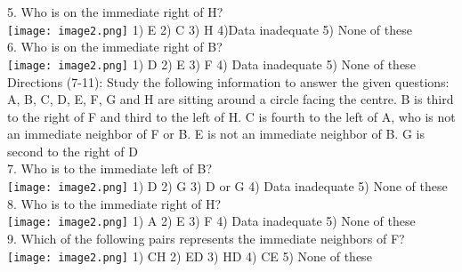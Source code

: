 \documentclass[
]{article}
\begin{document}
5. Who is on the immediate right of H?\\
\texttt{[image: image2.png]}
1) E \hspace{2mm}2) C \hspace{2mm}3) H
\hspace{2mm}4)Data inadequate \hspace{2mm}5) None of these\\

6. Who is on the immediate right of B?\\
\texttt{[image: image2.png]}
1) D \hspace{2mm}2) E \hspace{2mm}3) F
\hspace{2mm}4) Data inadequate \hspace{2mm}5) None of these\\

Directions (7-11): Study the following information to answer the given questions:\\
A, B, C, D, E, F, G and H are sitting around a circle facing the centre. B is third to the right of F
and third to the left of H. C is fourth to the left of A, who is not an immediate neighbor of F or B.
E is not an immediate neighbor of B. G is second to the right of D\\

7. Who is to the immediate left of B?\\
\texttt{[image: image2.png]}
1) D \hspace{2mm}2) G \hspace{2mm}3) D or G
\hspace{2mm}4) Data inadequate \hspace{2mm}5) None of these\\

8. Who is to the immediate right of H?\\
\texttt{[image: image2.png]}
1) A \hspace{2mm}2) E \hspace{2mm}3) F
\hspace{2mm}4) Data inadequate \hspace{2mm}5) None of these\\

9. Which of the following pairs represents the immediate neighbors of F?\\
\texttt{[image: image2.png]}
1) CH \hspace{2mm}2) ED \hspace{2mm}3) HD \hspace{2mm}4) CE \hspace{2mm}5) None of these\\
\end{document}
